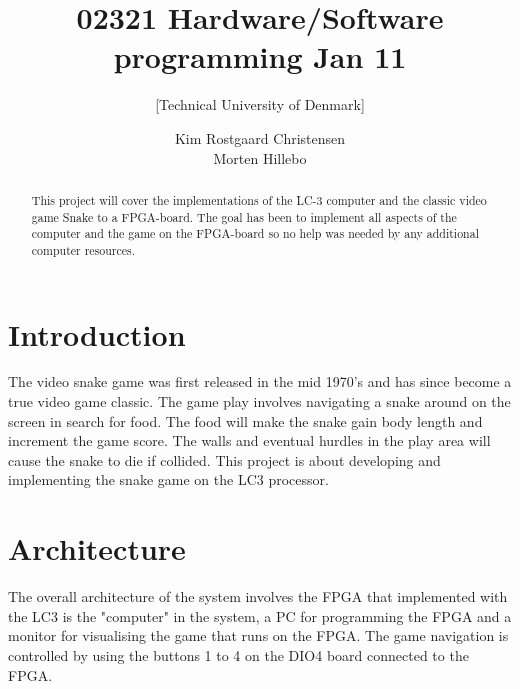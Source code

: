 \documentclass{acm_proc_article-sp}
\begin{document}
\title{02321 Hardware/Software programming Jan 11}
\subtitle{[Technical University of Denmark]
}

\author{
\alignauthor 
Kim Rostgaard Christensen\\
\alignauthor 
Morten Hillebo
}




\begin{abstract}
This project will cover the implementations of the LC-3 computer and the classic video game Snake to a FPGA-board. 
The goal has been to implement all aspects of the computer and the game on the FPGA-board so no help was needed by any additional computer resources.
\end{abstract}

\section{Introduction}
\label{sec:introduction}

The video snake game was first released in the mid 1970's and has since become a true video game classic. 
The game play involves navigating a snake around on the screen in search for food. 
The food will make the snake gain body length and increment the game score. 
The walls and eventual hurdles in the play area will cause the snake to die if collided.
This project is about developing and implementing the snake game on the LC3 processor. 
%

\section{Architecture}
The overall architecture of the system involves the FPGA that implemented with the LC3 is the "computer" in the system, a PC for programming the FPGA and a monitor for visualising the game that runs on the FPGA. 
The game navigation is controlled by using the buttons 1 to 4 on the DIO4 board connected to the FPGA.
\end{document}
